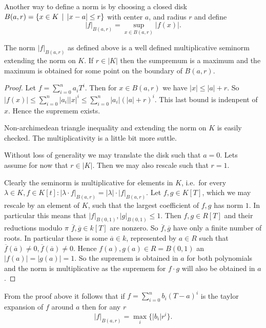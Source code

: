 Another way to define a norm is by choosing a closed disk $B(a, r) = \{x \in K \st |x - a| \le r\} $ with center $a$, and radius $r$ and define \[
	|f|_{B(a, r)} = \sup_{x \in B(a, r)} |f(x)|
.\] 
\begin{claim}
	The norm $|f|_{B(a, r)}$ as defined above is a well defined multiplicative seminorm extending the norm on $K$. 
	If $r \in |K|$ then the sumpremum is a maximum and the maximum is obtained for some point on the boundary of $B(a, r)$.
\end{claim}
\begin{proof}
	Let $f = \sum_{i = 0}^{n} a_i T^{i}$. 
	Then for $x \in B(a, r)$ we have $|x| \le |a| + r$. 
	So  $|f(x)| \le  \sum_{i = 0}^{n} |a_i| |x|^{i} \le \sum_{i = 0}^{n}|a_i| (|a| + r)^{i} $. 
	This last bound is indenpent of $x$. Hence the supremem exists. 

	Non-archimedean triangle inequality and extending the norm on $K$ is easily checked. 
	The multiplicativity is a little bit more suttle. 

	Without loss of generality we may translate the disk such that $a = 0$. 
	Lets assume for now that $r \in |K|$.
	Then we may also rescale such that $r = 1$. 

	Clearly the seminorm is multiplicative for elements in  $K$, i.e.\ for every $\lambda \in K, f \in K[t]: |\lambda \cdot f|_{B(a, r)} = |\lambda|\cdot |f|_{B(a, r)}$.  Let $f, g \in K[T]$, which we may rescale by an element of $K$, such that the largest coefficient of $f, g$ has norm $1$. In particular this means that $|f|_{B(0,1)}, |g|_{B(0,1)} \le 1$. 
	Then $f, g \in R[T]$ and their  reductions modulo  $\pi$ $\overline{f}, \overline{g} \in k[T]$ are nonzero.
	So $\overline{f}, \overline{g}$ have only a finite number of roots. In particular these is some $\overline{a} \in k$, represented by $a \in R$ such that $\overline{f}(\overline{a}) \ne 0, \overline{f}(\overline{a})\ne 0$. 
	Hence $f(a), g(a) \in R = B(0, 1)$ an $|f(a)| = |g(a)| = 1$. 
	So the supremem is obtained in $a$ for both polynomials and the norm is multiplicative as the supremem for $f\cdot g$ will also be obtained in $a$. 
\end{proof}

\begin{remark}\label{rem:norm_disk}
	From the proof above it follows that if $f = \sum_{i = 0}^{n} b_i (T-a)^{i}$ is the taylor expansion of $f$ around $a$ then for any $r$
	\[
		|f|_{B(a, r)} = \max_{i}\{  |b_i|r^{i}\}
	.\] 
\end{remark}


